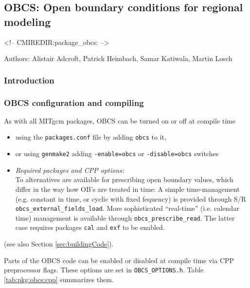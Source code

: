 \subsection{OBCS: Open boundary conditions for regional modeling}

\label{sec:pkg:obcs}
\begin{rawhtml}
<!-- CMIREDIR:package_obcs: -->
\end{rawhtml}

Authors: 
Alistair Adcroft, Patrick Heimbach, Samar Katiwala, Martin Losch

\subsubsection{Introduction
\label{sec:pkg:obcs:intro}}




\subsubsection{OBCS configuration and compiling
\label{sec:pkg:obcs:comp}}

As with all MITgcm packages, OBCS can be turned on or off 
at compile time
%
\begin{itemize}
%
\item
using the \texttt{packages.conf} file by adding \texttt{obcs} to it,
%
\item
or using \texttt{genmake2} adding
\texttt{-enable=obcs} or \texttt{-disable=obcs} switches
%
\item
\textit{Required packages and CPP options:} \\
%
To alternatives are available for prescribing open boundary values,
which differ in the way how OB's are treated in time:
A simple time-management (e.g. constant in time, or cyclic with
fixed fequency) is provided through 
S/R \texttt{obcs\_external\_fields\_load}.
More sophisticated ``real-time'' (i.e. calendar time) management is
available through \texttt{obcs\_prescribe\_read}. 
The latter case requires
packages \texttt{cal} and \texttt{exf} to be enabled.
%
\end{itemize}
(see also Section \ref{sec:buildingCode}).

Parts of the OBCS code can be enabled or disabled at compile time
via CPP preprocessor flags. These options are set in
\texttt{OBCS\_OPTIONS.h}. Table \ref{tab:pkg:obcs:cpp} summarizes them.

